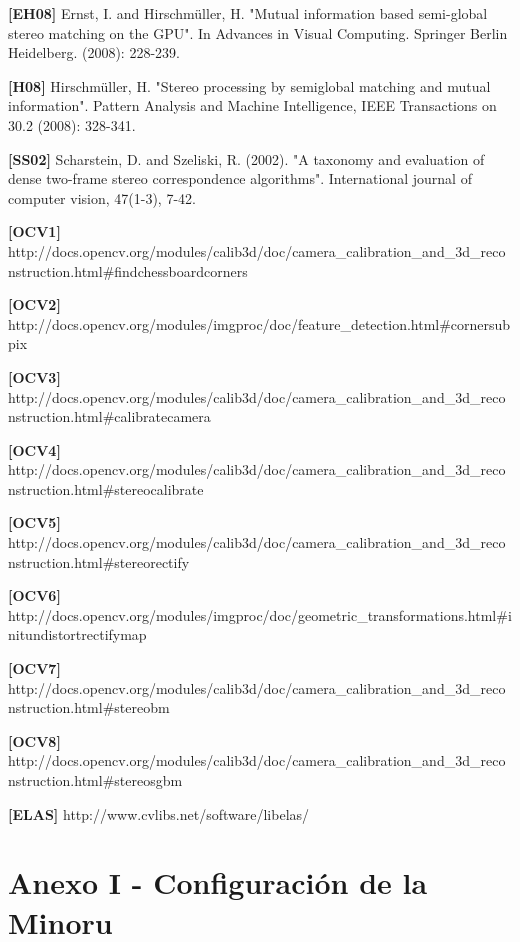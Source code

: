 \documentclass[11pt,a4paper,titlepage]{article}
\begin{document}
\textbf{[EH08]} Ernst, I. and Hirschmüller, H. "Mutual information based semi-global stereo matching on the GPU". In Advances in Visual Computing. Springer Berlin Heidelberg. (2008): 228-239.

\textbf{[H08]} Hirschmüller, H. "Stereo processing by semiglobal matching and mutual information". Pattern Analysis and Machine Intelligence, IEEE Transactions on 30.2 (2008): 328-341.

\textbf{[SS02]} Scharstein, D. and Szeliski, R. (2002). "A taxonomy and evaluation of dense two-frame stereo correspondence algorithms". International journal of computer vision, 47(1-3), 7-42.

\begin{sloppypar}
\textbf{[OCV1]} http:\slash\slash docs.opencv.org\slash modules\slash calib3d\slash doc\slash camera\_calibration\_and\_3d\_reconstruction.html\#findchessboardcorners

\textbf{[OCV2]} http:\slash \slash docs.opencv.org\slash modules\slash imgproc\slash doc\slash feature\_detection.html\#cornersubpix

\textbf{[OCV3]} http:\slash \slash docs.opencv.org\slash modules\slash calib3d\slash doc\slash camera\_calibration\_and\_3d\_reconstruction.html\#calibratecamera

\textbf{[OCV4]} http:\slash \slash docs.opencv.org\slash modules\slash calib3d\slash doc\slash camera\_calibration\_and\_3d\_reconstruction.html\#stereocalibrate

\textbf{[OCV5]} http:\slash \slash docs.opencv.org\slash modules\slash calib3d\slash doc\slash camera\_calibration\_and\_3d\_reconstruction.html\#stereorectify

\textbf{[OCV6]} http:\slash \slash docs.opencv.org\slash modules\slash imgproc\slash doc\slash geometric\_transformations.html\#initundistortrectifymap

\textbf{[OCV7]} http:\slash \slash docs.opencv.org\slash modules\slash calib3d\slash doc\slash camera\_calibration\_and\_3d\_reconstruction.html\#stereobm

\textbf{[OCV8]} http:\slash \slash docs.opencv.org\slash modules\slash calib3d\slash doc\slash camera\_calibration\_and\_3d\_reconstruction.html\#stereosgbm
\end{sloppypar}

\textbf{[ELAS]} http://www.cvlibs.net/software/libelas/

\newpage

\section{Anexo I - Configuración de la Minoru}
\end{document}

